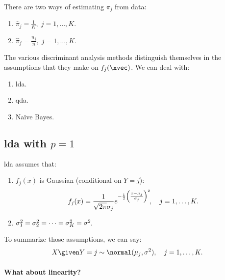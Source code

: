 There are two ways of estimating $\pi_j$ from data:
\begin{enumerate}
    \item $\hat{\pi}_j = \frac{1}{K},\; j = 1, \ldots, K$. 
    \item $\hat{\pi}_j = \frac{n_j}{n},\; j = 1, \ldots, K$. 
\end{enumerate}
The various discriminant analysis methods distinguish themselves in the assumptions that they make on $f_j(\xvec)$. We can deal with:
\begin{enumerate}
    \item \acf{lda}.
    \item \acf{qda}.
    \item Na\"ive Bayes.
\end{enumerate}

\subsection{\texorpdfstring{\acs{lda} with $p = 1$}{LDA with p = 1}}

\acl{lda} assumes that:
\begin{enumerate}
    \item $f_j(x)$ is Gaussian (conditional on $Y = j$):
          \begin{equation}
              f_j(x) = \frac{1}{\sqrt{2\pi}\sigma_j}e^{-\frac{1}{2}\left(\frac{x-\mu_j}{\sigma_j}\right)^2}\negthinspace,\quad j = 1, \ldots, K.
          \end{equation}
    \item $\sigma_1^2 = \sigma_2^2 = \cdots = \sigma_K^2 = \sigma^2\negthinspace$. 
\end{enumerate}
To summarize those assumptions, we can say:
\begin{equation}
    X \given Y = j \sim \normal(\mu_j, \sigma^2),\quad j = 1, \ldots, K.
\end{equation}

\paragraph{What about linearity?}


